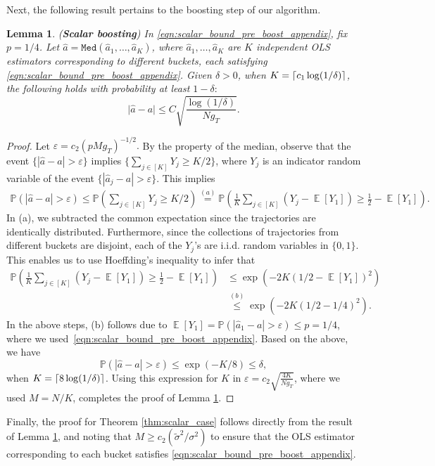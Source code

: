 \documentclass[letterpaper, 11 pt]{article}
\newcommand{\abs}[1]{\lvert #1 \rvert}
\newcommand{\abslr}[1]{\left\lvert#1\right\rvert}
\DeclarePairedDelimiter\ceil{\lceil}{\rceil}
\DeclareMathOperator{\E}{\mathbb{E}}
\newtheorem{lemma}{Lemma}
\begin{document}
Next, the following result pertains to the boosting step of our algorithm.
\begin{lemma} \label{lemma:scalar_boosting} (\textbf{Scalar boosting}) In \eqref{eqn:scalar_bound_pre_boost_appendix}, fix $p = 1/4$. Let $\hat{a} = \texttt{Med}(\hat{a}_1, \ldots, \hat{a}_K)$, where $\hat{a}_1, \ldots, \hat{a}_K$ are $K$ independent OLS estimators corresponding to different buckets, each satisfying \eqref{eqn:scalar_bound_pre_boost_appendix}. Given $\delta > 0$, when $K = \ceil{c_1 \log(1/\delta)}$, the following holds with probability at least $1 - \delta:$
$$\abs{\hat{a} - a} \leq C \sqrt{\frac{\log(1/\delta)}{N g_T}}.$$
\end{lemma}
\begin{proof}
    Let $\varepsilon = c_2({p M g_T})^{-1/2}.$ By the property of the median, observe that the event $\{ \abslr{\hat{a}-a} > \varepsilon\}$ implies $\{ \sum_{j \in [K]} Y_j \geq K/2 \}$, where $Y_j$ is an indicator random variable of the event  $\{ \abslr{\hat{a}_j-a} > \varepsilon\}$. This implies
    \begin{align*}
        \mathbb{P}\left( \abslr{\hat{a}-a} > \varepsilon \right) \leq \mathbb{P} \left( \sum_{j \in [K]} Y_j \geq K/2 \right) \overset{(a)}{=} \mathbb{P} \left( \frac{1}{K} \sum_{j \in [K]} (Y_j - \E[Y_1]) \geq \frac{1}{2}  - \E[Y_1] \right).
    \end{align*}
    In (a), we subtracted the common expectation since the trajectories are identically distributed. Furthermore, since the collections of trajectories from different buckets are disjoint, each of the $Y_j$'s are i.i.d. random variables in $\{0,1\}$. This enables us to use Hoeffding's inequality to infer that
    \begin{align*}
        \mathbb{P} \left( \frac{1}{K} \sum_{j \in [K]} (Y_j - \E[Y_1]) \geq \frac{1}{2}  - \E[Y_1] \right) &\leq \exp{\left(-2 K (1/2 - \E[Y_1])^2\right)} \\
        & \overset{(b)}{\leq} \exp{\left(-2 K (1/2 - 1/4)^2\right)}.
    \end{align*}
    In the above steps, (b) follows due to $\E[Y_1] = \mathbb{P}(\abslr{\hat{a}_1 - a} > \varepsilon) \leq p = 1/4$, where we used~\eqref{eqn:scalar_bound_pre_boost_appendix}.  Based on the above, we have
    $$ \mathbb{P}\left( | \hat{a}-a| > \varepsilon\right) \leq \exp(-K/8) \leq \delta,$$
    when $K=\ceil{8 \log(1/\delta)}$. Using this expression for $K$ in $\varepsilon= c_2\sqrt{\frac{4K}{N g_T}}$, where we used $M=N/K$, completes the proof of  Lemma \ref{lemma:scalar_boosting}.
\end{proof}
Finally, the proof for Theorem \ref{thm:scalar_case} follows directly from the result of Lemma \ref{lemma:scalar_boosting}, and noting that $M \geq c_2 (\tilde{\sigma}^2/\sigma^2)$ to ensure that the OLS estimator corresponding to each bucket satisfies \eqref{eqn:scalar_bound_pre_boost_appendix}. 
\end{document}
